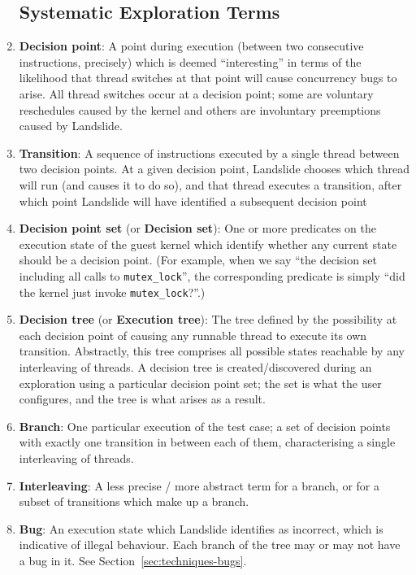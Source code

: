 \begin{enumerate}
\subsection{Systematic Exploration Terms}

	\item {\bf Decision point}:
		A point during execution (between two consecutive instructions, precisely) which is deemed ``interesting'' in terms of the likelihood that thread switches at that point will cause concurrency bugs to arise. All thread switches occur at a decision point; some are voluntary reschedules caused by the kernel and others are involuntary preemptions caused by Landslide.
	\item {\bf Transition}:
		A sequence of instructions executed by a single thread between two decision points. At a given decision point, Landslide chooses which thread will run (and causes it to do so), and that thread executes a transition, after which point Landslide will have identified a subsequent decision point
	\item {\bf Decision point set} (or {\bf Decision set}):
		One or more predicates on the execution state of the guest kernel which identify whether any current state should be a decision point. (For example, when we say ``the decision set including all calls to \texttt{mutex\_lock}'', the corresponding predicate is simply ``did the kernel just invoke \texttt{mutex\_lock}?''.)
	\item {\bf Decision tree} (or {\bf Execution tree}):
		The tree defined by the possibility at each decision point of causing any runnable thread to execute its own transition. Abstractly, this tree comprises all possible states reachable by any interleaving of threads.
		A decision tree is created/discovered during an exploration using a particular decision point set; the set is what the user configures, and the tree is what arises as a result.
	\item {\bf Branch}:
		One particular execution of the test case; a set of decision points with exactly one transition in between each of them, characterising a single interleaving of threads.
	\item {\bf Interleaving}:
		A less precise / more abstract term for a branch, or for a subset of transitions which make up a branch.
	\item {\bf Bug}: An execution state which Landslide identifies as incorrect, which is indicative of illegal behaviour. Each branch of the tree may or may not have a bug in it. See Section~\ref{sec:techniques-bugs}.

\end{enumerate}
